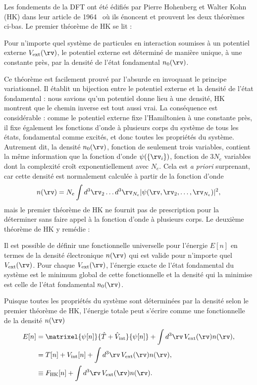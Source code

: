 Les fondements de la DFT ont été édifiés par Pierre Hohenberg et Walter Kohn (HK) dans leur article de 1964~\cite{hohenbergInhomogeneousElectronGas1964} où ils énoncent et prouvent les deux théorèmes ci-bas. Le premier théorème de HK se lit : 
\begin{theo}
    \label{thm:hk1}
    Pour n'importe quel système de particules en interaction soumises à un potentiel externe $V_\text{ext}(\rv)$, le potentiel externe est déterminé de manière unique, à une constante près, par la densité de l'état fondamental $n_0(\rv)$.
\end{theo}
\noindent
Ce théorème est facilement prouvé par l'absurde en invoquant le principe variationnel. Il établit un bijection entre le potentiel externe et la densité de l'état fondamental : nous savions qu'un potentiel donne lieu à une densité, HK montrent que le chemin inverse est tout aussi vrai. La conséquence est considérable : comme le potentiel externe fixe l'Hamiltonien à une constante près, il fixe également les fonctions d'onde à plusieurs corps du système de tous les états, fondamental comme excités, et donc toutes les propriétés du système. Autrement dit, la densité $n_0(\rv)$, fonction de seulement trois variables, contient la même information que la fonction d'onde $\psi(\{\rv_i\})$, fonction de $3N_e$ variables dont la complexité croît exponentiellement avec $N_e$. Cela est \textit{a priori} surprenant, car cette densité est normalement calculée à partir de la fonction d'onde
\begin{equation}
    n(\rv)=N_e\int d^3\rv_2\dots d^3\rv_{N_e}|\psi(\rv,\rv_2,\dots,\rv_{N_e})|^2,
\end{equation}
mais le premier théorème de HK ne fournit pas de prescription pour la déterminer sans faire appel à la fonction d'onde à plusieurs corps. Le deuxième théorème de HK y remédie : 
\begin{theo}
    \label{thm:hk2}
    Il est possible de définir une fonctionnelle universelle pour l'énergie $E[n]$ en termes de la densité électronique $n(\rv)$ qui est valide pour n'importe quel $V_\text{ext}(\rv)$. Pour chaque $V_\text{ext}(\rv)$, l'énergie exacte de l'état fondamental du système est le minimum global de cette fonctionnelle et la densité qui la minimise est celle de l'état fondamental $n_0(\rv)$. 
\end{theo}
\noindent
Puisque toutes les propriétés du système sont déterminées par la densité selon le premier théorème de HK, l'énergie totale peut s'écrire comme une fonctionnelle de la densité $n(\rv)$
\begin{align}
    E[n]&=\matrixel{\psi[n]}{\hat{T}+\hat{V}_\text{int}}{\psi[n]}+\int d^3\rv\,V_\text{ext}(\rv)n(\rv),\notag\\
    &= T[n]+V_\text{int}[n]+\int d^3\rv\,V_\text{ext}(\rv)n(\rv),\notag\\
    &\equiv F_\text{HK}[n]+\int d^3\rv\,V_\text{ext}(\rv)n(\rv).
\end{align}
